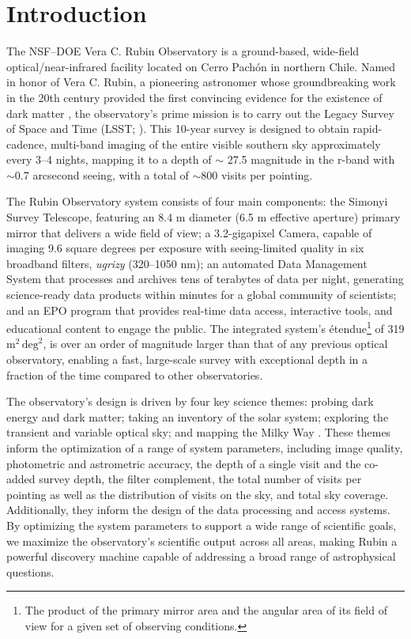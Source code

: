 \section{Introduction
\label{sec:intro}}
The \gls{NSF}–\gls{DOE} Vera C. Rubin Observatory is a ground-based, wide-field optical/near-infrared facility located on Cerro Pach\'on in northern Chile.
Named in honor of Vera C. Rubin, a pioneering astronomer whose groundbreaking work in the 20th century provided the first convincing evidence for the existence of dark matter \citep{1970ApJ...159..379R, 1980ApJ...238..471R}, the observatory’s prime mission is to carry out the Legacy Survey of Space and Time (\gls{LSST}; \citealt{2019ApJ...873..111I}).
This 10-year survey is designed to obtain rapid-\gls{cadence}, multi-band imaging of the entire visible southern sky approximately every 3–4 nights, mapping it to a depth of $\sim$ 27.5 magnitude in the r-band with $\sim$0.7 arcsecond \gls{seeing}, with a total of $\sim$800 visits per pointing.

The Rubin Observatory system consists of four main components: the \gls{Simonyi Survey Telescope}, featuring an 8.4 m diameter (6.5 m effective aperture) primary mirror that delivers a wide field of view; a 3.2-gigapixel Camera, capable of imaging 9.6 square degrees per exposure with seeing-limited quality in six broadband filters, \textit{ugrizy} (320–1050 nm); an automated \gls{Data Management System} that processes and archives tens of terabytes of data per night, generating science-ready data products within minutes for a global community of scientists; and an \gls{EPO} program that provides real-time data access, interactive tools, and educational content to engage the public.
The integrated system's \'etendue\footnote{The product of the primary mirror area and the angular area of its field of view for a given set of observing conditions.} of 319 $\text{m}^2 \,\text{deg}^2$, is over an order of magnitude larger than that of any previous optical observatory, enabling a fast, large-scale survey with exceptional depth in a fraction of the time compared to other observatories.

The observatory's design is driven by four key science themes: probing dark energy and dark matter; taking an inventory of the solar system; exploring the transient and variable optical sky; and mapping the Milky Way \citep{2019ApJ...873..111I}.
These themes inform the optimization of a range of system parameters, including image quality, photometric and astrometric accuracy, the depth of a single visit and the co-added survey depth, the filter complement, the total number of visits per pointing as well as the distribution of visits on the sky, and  total sky coverage.
Additionally, they inform the design of the data processing and access systems.
By optimizing the system parameters to support a wide range of scientific goals, we maximize the observatory's scientific output across all areas, making Rubin a powerful discovery machine capable of addressing a broad range of astrophysical questions.

